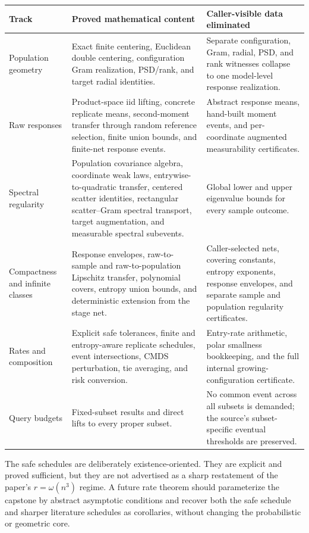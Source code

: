 \documentclass[11pt]{article}
\begin{document}
\begin{longtable}{>{\raggedright\arraybackslash}p{}
                  >{\raggedright\arraybackslash}p{}
                  >{\raggedright\arraybackslash}p{}}
\toprule
Track & Proved mathematical content & Caller-visible data eliminated \\
\midrule
\endhead
Population geometry & Exact finite centering, Euclidean double centering,
configuration Gram realization, PSD/rank, and target radial identities. &
Separate configuration, Gram, radial, PSD, and rank witnesses collapse to one
model-level response realization. \\
\addlinespace
Raw responses & Product-space iid lifting, concrete replicate means,
second-moment transfer through random reference selection, finite union bounds,
and finite-net response events. & Abstract response means, hand-built moment
events, and per-coordinate augmented measurability certificates. \\
\addlinespace
Spectral regularity & Population covariance algebra, coordinate weak laws,
entrywise-to-quadratic transfer, centered scatter identities, rectangular
scatter--Gram spectral transport, target augmentation, and measurable spectral
subevents. & Global lower and upper eigenvalue bounds for every sample outcome.
\\
\addlinespace
Compactness and infinite classes & Response envelopes, raw-to-sample and
raw-to-population Lipschitz transfer, polynomial covers, entropy union bounds,
and deterministic extension from the stage net. & Caller-selected nets,
covering constants, entropy exponents, response envelopes, and separate sample
and population regularity certificates. \\
\addlinespace
Rates and composition & Explicit safe tolerances, finite and entropy-aware
replicate schedules, event intersections, CMDS perturbation, tie averaging, and
risk conversion. & Entry-rate arithmetic, polar smallness bookkeeping, and the
full internal growing-configuration certificate. \\
\addlinespace
Query budgets & Fixed-subset results and direct lifts to every proper subset. &
No common event across all subsets is demanded; the source's subset-specific
eventual thresholds are preserved. \\
\bottomrule
\end{longtable}

The safe schedules are deliberately existence-oriented.  They are explicit and
proved sufficient, but they are not advertised as a sharp restatement of the
paper's $r=\omega(n^3)$ regime.  A future rate theorem should parameterize the
capstone by abstract asymptotic conditions and recover both the safe schedule
and sharper literature schedules as corollaries, without changing the
probabilistic or geometric core.
\end{document}
